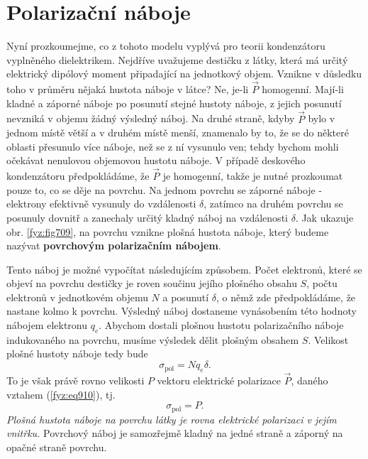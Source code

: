   \section{Polarizační náboje}\label{fyz:IIchapXsecIII}   
    Nyní prozkoumejme, co z tohoto modelu vyplývá pro teorii kondenzátoru vyplněného dielektrikem.
    Nejdříve uvažujeme destičku z látky, která má určitý elektrický dipólový moment připadající na
    jednotkový objem. Vznikne v důsledku toho v průměru nějaká hustota náboje v látce? Ne, je-li
    \(\vec{P}\) homogenní. Mají-li kladné a záporné náboje po posunutí stejné hustoty náboje, z
    jejich posunutí nevzniká v objemu žádný výsledný náboj. Na druhé straně, kdyby \(\vec{P}\) bylo
    v jednom místě větší a v druhém místě menší, znamenalo by to, že se do některé oblasti přesunulo
    více náboje, než se z ní vysunulo ven; tehdy bychom mohli očekávat nenulovou objemovou hustotu
    náboje. V případě deskového kondenzátoru předpokládáme, že \(\vec{P}\) je homogenní, takže je
    nutné prozkoumat pouze to, co se děje na povrchu. Na jednom povrchu se záporné náboje -
    elektrony efektivně vysunuly do vzdálenosti \(δ\), zatímco na druhém povrchu se posunuly dovnitř
    a zanechaly určitý kladný náboj na vzdálenosti \(δ\). Jak ukazuje obr. \ref{fyz:fig709}, na
    povrchu vznikne plošná hustota náboje, který budeme nazývat \textbf{povrchovým polarizačním
    nábojem}.

    Tento náboj je možné vypočítat následujícím způsobem. Počet elektronů, které se objeví na
    povrchu destičky je roven součinu jejího plošného obsahu \(S\), počtu elektronů v jednotkovém
    objemu \(N\) a posunutí \(δ\), o němž zde předpokládáme, že nastane kolmo k povrchu. Výsledný
    náboj dostaneme vynásobením této hodnoty nábojem elektronu \(q_e\). Abychom dostali plošnou
    hustotu polarizačního náboje indukovaného na povrchu, musíme výsledek dělit plošným obsahem
    \(S\). Velikost plošné hustoty náboje tedy bude
    \begin{equation*}
      σ_{\text{pol}}=Nq_eδ.
    \end{equation*}
    To je však právě rovno velikosti \(P\) vektoru elektrické polarizace \(\vec{P}\), daného vztahem
    (\ref{fyz:eq910}), tj. 
    \begin{equation}\label{fyz:eq911}
      σ_{\text{pol}} = P.
    \end{equation}
    \emph{Plošná hustota náboje na povrchu látky je rovna elektrické polarizaci v jejím vnitřku.}
    Povrchový náboj je samozřejmě kladný na jedné straně a záporný na opačné straně povrchu.

